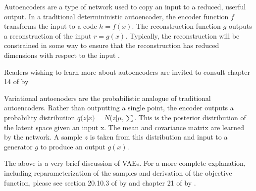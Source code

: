 \documentclass{article}
\begin{document}
Autoencoders are a type of network used to copy an input to a reduced, userful output. In a traditional determininistic autoencoder, the encoder function \(f\) transforms the input to a code \(h = f(x)\). The reconstruction function \(g\) outputs a reconstruction of the input \(r = g(x)\). Typically, the reconstruction will be constrained in some way to ensure that the reconstruction has reduced dimensions with respect to the input \cite{Goodfellow-et-al-2016}.

Readers wishing to learn more about autoencoders are invited to consult chapter 14 of  by 

Variational autoenoders are the probabilistic analogue of traditional autoencoders. Rather than outputting a single point, the encoder outputs a probability distribution \(q(z|x) = N(z|\mu , \sum\). This is the posterior distribution of the latent space given an input x. The mean and covariance matrix are learned by the network. A sample \(z\) is taken from this distribution and input to a generator \(g\) to produce an output \(g(x)\).

The above is a very brief discussion of VAEs. For a more complete explanation, including reparameterization of the samples and derivation of the objective function, please see section 20.10.3 of  by \citeauthor{Goodfellow-et-al-2016} and chapter 21 of  by \citeauthor{pml2Book}.
\newpage


\printbibliography
\end{document}
